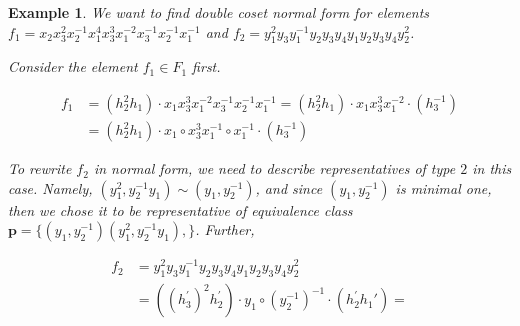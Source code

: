 \documentclass[a4paper,12pt]{article}
\newcommand{\pp}{\mathbf{p}}
\newtheorem{exam}[theorem]{Example}
\newenvironment{example}{\begin{exam} \rm}{\end{exam}}
\numberwithin{equation}{section}
\numberwithin{figure}{section}
\begin{document}
\begin{example}
We want to find double coset normal form for elements $f_1 =
x_2x_3^2x_2^{-1} x_1^4x_3^3x_1^{-2}x_3^{-1}x_2^{-1}x_1^{-1}$ and
$f_2=y_1^2y_3y_1^{-1}y_2y_3y_4y_1y_2 y_3y_4y_2^2$.

Consider the element $f_1 \in F_1$ first.

\begin{align*}
f_1 &= (h_2^2h_1)\cdot x_1x_3^3x_1^{-2}x_3^{-1}x_2^{-1}x_1^{-1} =
(h_2^2h_1)\cdot x_1x_3^3x_1^{-2}\cdot(h_3^{-1})\\
&= (h_2^2h_1)\cdot x_1 \circ x_3^3x_1^{-1}\circ
x_1^{-1}\cdot(h_3^{-1})
\end{align*}

To rewrite $f_2$ in normal form, we need to describe
representatives of type $2$ in this case. Namely, $(y_1^2,
y_2^{-1}y_1) \sim (y_1,y_2^{-1})$, and since $(y_1,y_2^{-1})$ is
minimal one, then we chose it to be representative of equivalence
class $\pp = \{(y_1,y_2^{-1})(y_1^2, y_2^{-1}y_1),  \}$. Further,

\begin{align*}
f_2 &= y_1^2y_3y_1^{-1}y_2y_3y_4y_1y_2y_3y_4y_2^2\\ &=
((h_3^{\prime})^2h_2^{\prime}) \cdot y_1 \circ (y_2^{-1})^{-1}
\cdot(h_2^{\prime}h_1{\prime})=
\end{align*}


\end{example}

\end{document}
